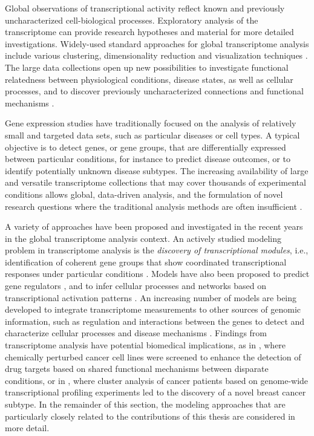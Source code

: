 Global observations of transcriptional activity reflect known and
previously uncharacterized cell-biological processes. Exploratory
analysis of the transcriptome can provide research hypotheses and
material for more detailed investigations. Widely-used standard
approaches for global transcriptome analysis include various
clustering, dimensionality reduction and visualization techniques
\citep[see e.g.][]{Huttenhower2010, Polanski07, Quackenbush01}.  The
large data collections open up new possibilities to investigate
functional relatedness between physiological conditions, disease
states, as well as cellular processes, and to discover previously
uncharacterized connections and functional mechanisms
\citep{Bergmann04, Kilpinen08, Lukk10}.

Gene expression studies have traditionally focused on the analysis of
relatively small and targeted data sets, such as particular diseases
or cell types. A typical objective is to detect genes, or gene groups,
that are differentially expressed between particular conditions, for
instance to predict disease outcomes, or to identify potentially
unknown disease subtypes.  The increasing availability of large and
versatile transcriptome collections that may cover thousands of
experimental conditions allows global, data-driven analysis, and the
formulation of novel research questions where the traditional analysis
methods are often insufficient \citep{Huttenhower2010}.  

A variety of approaches have been proposed and investigated in the
recent years in the global transcriptome analysis context. An actively
studied modeling problem in transcriptome analysis is the {\it
  discovery of transcriptional modules}, i.e., identification of
coherent gene groups that show coordinated transcriptional responses
under particular conditions \citep{Segal03psb, Segal04nature,
  Stuart03}. Models have also been proposed to predict gene regulators
\citep{Segal03nature}, and to infer cellular processes and networks
based on transcriptional activation patterns \citep{Friedman04,
  Segal03a}. An increasing number of models are being developed to
integrate transcriptome measurements to other sources of genomic
information, such as regulation and interactions between the genes to
detect and characterize cellular processes and disease mechanisms
\citep{Barash02, Chari2010a, Vaske2010}.  Findings from transcriptome
analysis have potential biomedical implications, as in \cite{Lamb06},
where chemically perturbed cancer cell lines were screened to enhance
the detection of drug targets based on shared functional mechanisms
between disparate conditions, or in \cite{Sorlie01}, where cluster
analysis of cancer patients based on genome-wide transcriptional
profiling experiments led to the discovery of a novel breast cancer
subtype. In the remainder of this section, the modeling approaches
that are particularly closely related to the contributions of this
thesis are considered in more detail.


